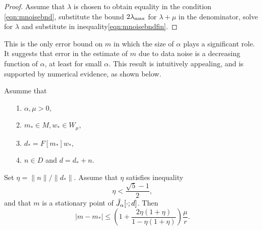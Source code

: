 \begin{proof} Assume that $\lambda$ is chosen to obtain equality in
  the condition \ref{eqn:mnoisebnd}, substitute the bound $2
  \lambda_{\rm max}$ for $\lambda + \mu$ in the denominator, solve for
  $\lambda$ and substitute in inequality\ref{eqn:mnoisebndfin}.
\end{proof}

 This is the only error bound on $m$ in which
the size of $\alpha$ plays a significant role. It
suggests that error in the estimate of $m$ due to data noise is a
decreasing function of $\alpha$, at least for small $\alpha$. This result is intuitively
appealing, and is supported by numerical evidence, as shown below.

\begin{theorem}
  \label{thm:mnoiseres}
  Asumme that
  \begin{itemize}
  \item[1. ] $\alpha, \mu> 0$,
  \item[2. ] $m_* \in M, w_* \in W_{\mu}$,
  \item[3. ] $d_* = F[m_*]w_*$,
  \item[4. ] $n \in D$ and $d = d_* + n$.
  \end{itemize}
  Set $\eta = \|n\|/\|d_*\|$. Assume that $\eta$ satisfies inequality \begin{equation}
  \label{eqn:mnoisecond}    
  \eta < \frac{\sqrt{5}-1}{2},
  \end{equation}
  and that $m$ is a stationary point of $\tilde{J}_{\alpha}[\cdot;d]$.
  Then
  \begin{equation}
    \label{eqn:mnoisesuff}
    |m-m_*| \le \left(1+\frac{2\eta(1+\eta)}{1-\eta(1+\eta)}\right)\frac{\mu}{r}.
  \end{equation}
\end{theorem}

